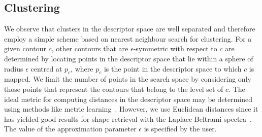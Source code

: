 \documentclass[review,journal]{vgtc}         %
\begin{document}
\subsection{Clustering}
We observe that clusters in the descriptor space are well separated and therefore
employ a simple scheme based on nearest neighbour search for clustering.
For a given contour $c$, other contours that are $\epsilon$-symmetric
with respect to $c$ are determined by locating points in the descriptor
space that lie within a sphere of radius $\epsilon$ centred at $p_c$,
where $p_c$ is the point in the descriptor space to which $c$ is mapped.
We limit the number of points in the search space 
by considering only those points that represent the contours that belong to
the level set of $c$. 
{\color{blue}The ideal metric for computing
distances in the descriptor space may be determined using methods like
metric learning~\cite{Kulis13}. However, we use
Euclidean distances since it has yielded good results 
for shape retrieval with the Laplace-Beltrami spectra~\cite{reuter2006laplace,lian2013}. }
The value of the approximation parameter $\epsilon$
is specified by the user.
\end{document}
